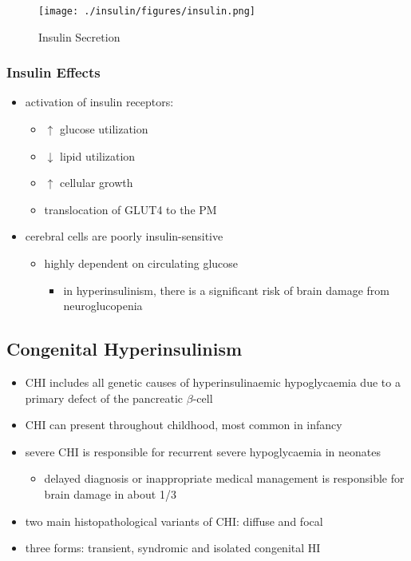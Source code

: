 \documentclass{scrartcl}
\begin{document}
\begin{figure}[htbp]
\centering
\texttt{[image: ./insulin/figures/insulin.png]}
\caption[insulin]{\label{fig:org045a844}
Insulin Secretion}
\end{figure}

\subsubsection{Insulin Effects}
\label{sec:org7f7569f}
\begin{itemize}
\item activation of insulin receptors:
\begin{itemize}
\item \(\uparrow\) glucose utilization
\item \(\downarrow\) lipid utilization
\item \(\uparrow\) cellular growth
\item translocation of GLUT4 to the PM
\end{itemize}
\item cerebral cells are poorly insulin-sensitive
\begin{itemize}
\item highly dependent on circulating glucose
\begin{itemize}
\item in hyperinsulinism, there is a significant risk of brain damage
from neuroglucopenia
\end{itemize}
\end{itemize}
\end{itemize}

\subsection{Congenital Hyperinsulinism}
\label{sec:orgacadcd3}
\begin{itemize}
\item CHI includes all genetic causes of hyperinsulinaemic
hypoglycaemia due to a primary defect of the pancreatic
\(\beta\)-cell
\item CHI can present throughout childhood, most common in infancy
\item severe CHI is responsible for recurrent severe hypoglycaemia in neonates
\begin{itemize}
\item delayed diagnosis or inappropriate medical management is responsible for brain damage in about 1/3
\end{itemize}
\item two main histopathological variants of CHI: diffuse and focal
\item three forms: transient, syndromic and isolated congenital HI
\end{itemize}
\end{document}
